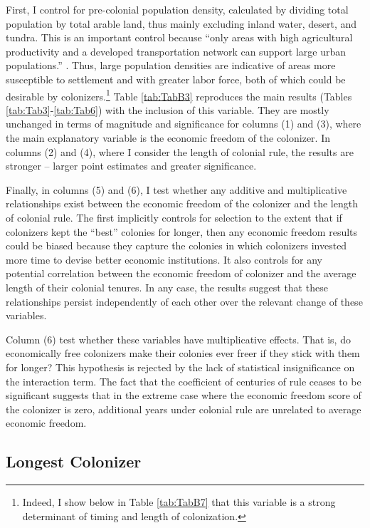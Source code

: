 \documentclass[a4paper,12pt]{article}
\begin{document}
First, I control for pre-colonial population density, calculated by dividing total population by total arable land, thus mainly excluding inland water, desert, and tundra. This is an important control because ``only areas with high agricultural productivity and a developed transportation network can support large urban populations.'' \citep[][p.1232]{acemoglu2002reversal}. Thus, large population densities are indicative of areas more susceptible to settlement and with greater labor force, both of which could be desirable by colonizers.\footnote{Indeed, I show below in Table \ref{tab:TabB7} that this variable is a strong determinant of timing and length of colonization.} Table \ref{tab:TabB3} reproduces the main results (Tables \ref{tab:Tab3}-\ref{tab:Tab6}) with the inclusion of this variable. They are mostly unchanged in terms of magnitude and significance for columns (1) and (3), where the main explanatory variable is the economic freedom of the colonizer. In columns (2) and (4), where I consider the length of colonial rule, the results are stronger -- larger point estimates and greater significance.

Finally, in columns (5) and (6), I test whether any additive and multiplicative relationships exist between the economic freedom of the colonizer and the length of colonial rule. The first implicitly controls for selection to the extent that if colonizers kept the ``best'' colonies for longer, then any economic freedom results could be biased because they capture the colonies in which colonizers invested more time to devise better economic institutions. It also controls for any potential correlation between the economic freedom of colonizer and the average length of their colonial tenures. In any case, the results suggest that these relationships persist independently of each other over the relevant change of these variables. 

Column (6) test whether these variables have multiplicative effects. That is, do economically free colonizers make their colonies ever freer if they stick with them for longer? This hypothesis is rejected by the lack of statistical insignificance on the interaction term. The fact that the coefficient of centuries of rule ceases to be significant suggests that in the extreme case where the economic freedom score of the colonizer is zero, additional years under colonial rule are unrelated to average economic freedom. 

\subsection{Longest Colonizer}
\end{document}
